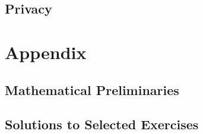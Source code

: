 \documentclass{book}
\begin{document}

  \chapter{Privacy}\label{sec:sd:privacy}

%
%  

\part{Appendix}

\appendix

\chapter{Mathematical Preliminaries}\label{sec:math}


\chapter{Solutions to Selected Exercises}


\tocentryBib


%
%
%
\end{document}
